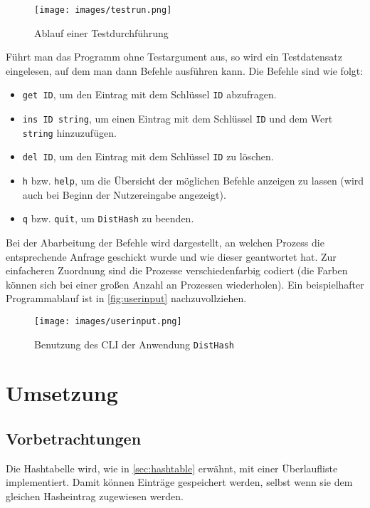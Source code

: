 \documentclass{scrreprt}
\begin{document}
\begin{figure}[!ht]
\centering
\texttt{[image: images/testrun.png]}
\caption{Ablauf einer Testdurchführung}
\label{fig:testrun}
\end{figure}

Führt man das Programm ohne Testargument aus, so wird ein Testdatensatz eingelesen, auf dem man dann Befehle ausführen kann. Die Befehle sind wie folgt:
\begin{itemize}
\item \lstinline`get ID`, um den Eintrag mit dem Schlüssel \lstinline`ID` abzufragen.
\item \lstinline`ins ID string`, um einen Eintrag mit dem Schlüssel \lstinline`ID` und dem Wert \lstinline`string` hinzuzufügen.
\item \lstinline`del ID`, um den Eintrag mit dem Schlüssel \lstinline`ID` zu löschen.
\item \lstinline`h` bzw. \lstinline`help`, um die Übersicht der möglichen Befehle anzeigen zu lassen (wird auch bei Beginn der Nutzereingabe angezeigt).
\item \lstinline`q` bzw. \lstinline`quit`, um \lstinline`DistHash` zu beenden.
\end{itemize}


Bei der Abarbeitung der Befehle wird dargestellt, an welchen Prozess die entsprechende Anfrage geschickt wurde und wie dieser geantwortet hat. Zur einfacheren Zuordnung sind die Prozesse verschiedenfarbig codiert (die Farben können sich bei einer großen Anzahl an Prozessen wiederholen). Ein beispielhafter Programmablauf ist in \autoref{fig:userinput} nachzuvollziehen.

\begin{figure}[!ht]
\centering
\texttt{[image: images/userinput.png]}
\caption{Benutzung des CLI der Anwendung \lstinline`DistHash`}
\label{fig:userinput}
\end{figure}


\chapter{Umsetzung}

\section{Vorbetrachtungen}

Die Hashtabelle wird, wie in \autoref{sec:hashtable} erwähnt, mit einer Überlaufliste implementiert. Damit können Einträge gespeichert werden, selbst wenn sie dem gleichen Hasheintrag zugewiesen werden.
\end{document}
